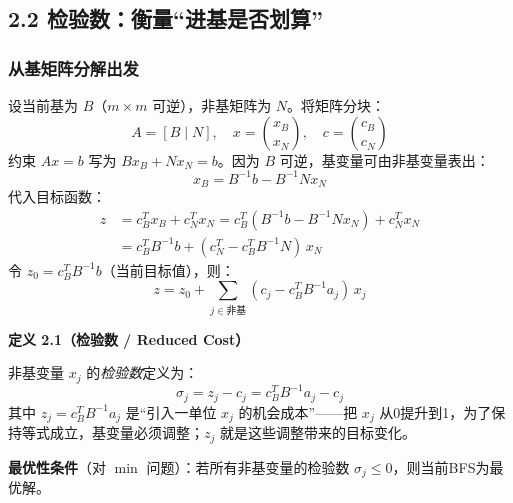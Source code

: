 \medskip
{}
\medskip

\subsection{2.2 检验数：衡量“进基是否划算”}

\subsubsection{从基矩阵分解出发}

设当前基为 $B$（$m\times m$ 可逆），非基矩阵为 $N$。将矩阵分块：
\[
A = [B \mid N],\quad x = \binom{x_B}{x_N},\quad c = \binom{c_B}{c_N}
\]
约束 $Ax=b$ 写为 $Bx_B + Nx_N = b$。因为 $B$ 可逆，基变量可由非基变量表出：
\[
x_B = B^{-1}b - B^{-1}N x_N
\]
代入目标函数：
\[
\begin{aligned}
z &= c_B^T x_B + c_N^T x_N
   = c_B^T(B^{-1}b - B^{-1}N x_N) + c_N^T x_N \\
  &= c_B^T B^{-1}b + (c_N^T - c_B^T B^{-1}N)\,x_N
\end{aligned}
\]
令 $z_0 = c_B^T B^{-1}b$（当前目标值），则：
\[
z = z_0 + \sum_{j \in \text{非基}} (c_j - c_B^T B^{-1} a_j)\,x_j
\]

\begin{defbox}
\textbf{定义 2.1（检验数 / Reduced Cost）}

非基变量 $x_j$ 的\emph{检验数}定义为：
\[
\sigma_j = z_j - c_j = c_B^T B^{-1} a_j - c_j
\]
其中 $z_j = c_B^T B^{-1} a_j$ 是“引入一单位 $x_j$ 的机会成本”——把 $x_j$ 从0提升到1，为了保持等式成立，基变量必须调整；$z_j$ 就是这些调整带来的目标变化。

\textbf{最优性条件}（对 $\min$ 问题）：若所有非基变量的检验数 $\sigma_j \le 0$，则当前BFS为最优解。
\end{defbox}


